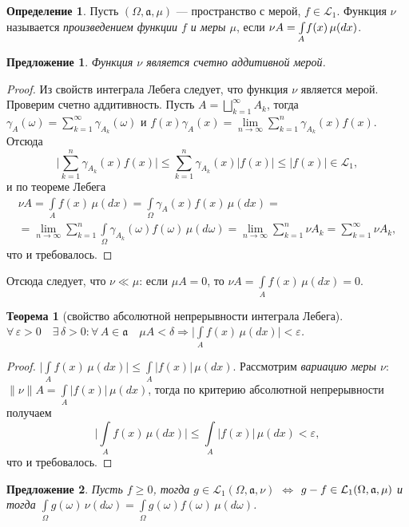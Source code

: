 \documentclass[12pt,titlepage]{article}
\newcounter{tema}
\newtheorem{theorem}{Теорема}[tema]
\newtheorem{predl}{Предложение}[tema]
\theoremstyle{definition}
\newtheorem{defen}{Определение}[tema]
\newcommand*{\p}[1]{#1\nobreak\discretionary{}{\hbox{$\mathsurround=0pt #1$}}{}}
\begin{document}
\begin{defen}
Пусть $(\Omega, \mathfrak{a},\mu)$ --- пространство с мерой,
$f\in\mathcal{L}_1$. Функция $\nu$ называется \emph{произведением
функции $f$ и меры $\mu$}, если $\nu
A\p=\int\limits_A\!f(x)\,\mu(dx)$.
\end{defen}

\begin{predl}
Функция $\nu$ является счетно аддитивной мерой.
\end{predl}

\begin{proof}
Из свойств интеграла Лебега следует, что функция $\nu$ является
мерой. Проверим счетно аддитивность. Пусть
$A=\bigsqcup\limits_{k=1}^\infty A_k$, тогда
$\gamma_A(\omega)=\sum\limits_{k=1}^\infty\gamma_{A_k}(\omega)$ и
$f(x)\gamma_A(x)=\lim\limits_{n\to\infty}\sum\limits_{k=1}^n\gamma_{A_k}(x)f(x)$.
Отсюда $$\Big|\sum\limits_{k=1}^n\gamma_{A_k}(x)f(x)\Big|\leqslant
\sum\limits_{k=1}^n\gamma_{A_k}(x)|f(x)|\leqslant|f(x)|\in\mathcal{L}_1,$$
и по теореме Лебега
\begin{multline*}
\nu
A=\int\limits_A\!f(x)\,\mu(dx)=\int\limits_\Omega\!\gamma_A(x)f(x)\,\mu(dx)=\\
=\lim\limits_{n\to\infty}\sum\limits_{k=1}^n\int\limits_\Omega\!\gamma_{A_k}(\omega)
f(\omega)\,\mu(d\omega)=\lim\limits_{n\to\infty}\sum\limits_{k=1}^n\nu
A_k=\sum\limits_{k=1}^\infty \nu A_k,
\end{multline*}
что и требовалось.
\end{proof}

Отсюда следует, что $\nu\ll \mu$: если $\mu A=0$, то $\nu
A=\int\limits_A\!f(x)\,\mu(dx)=0$.

\begin{theorem}[свойство абсолютной непрерывности интеграла Лебега]
$\forall\,\varepsilon>0\quad\exists\,\delta>0:\forall\,A\in\mathfrak{a}\quad
\mu
A<\delta\Rightarrow\big|\int\limits_A\!f(x)\,\mu(dx)\big|<\varepsilon$.
\end{theorem}

\begin{proof}
$\big|\int\limits_A\!f(x)\,\mu(dx)\big|\leqslant\int\limits_A\!|f(x)|\,\mu(dx)$.
Рассмотрим \emph{вариацию меры $\nu$}:
$\|\nu\|A=\int\limits_A\!|f(x)|\,\mu(dx)$, тогда по критерию
абсолютной непрерывности получаем
$$\Big|\int\limits_A\!f(x)\,\mu(dx)\Big|\leqslant\int\limits_A\!|f(x)|\,\mu(dx)<\varepsilon,$$
что и требовалось.
\end{proof}

\begin{predl}
Пусть $f\geqslant 0$, тогда
$g\in\mathcal{L}_1(\Omega,\mathfrak{a},\nu)$ $\Leftrightarrow$
$g-f\p\in\mathcal{L}_1(\Omega,\mathfrak{a},\mu)$ и тогда
$\int\limits_\Omega\!g(\omega)\,\nu(d\omega)=\int\limits_\Omega\!g(\omega)f(\omega)\,\mu(d\omega)$.
\end{predl}
\end{document}
